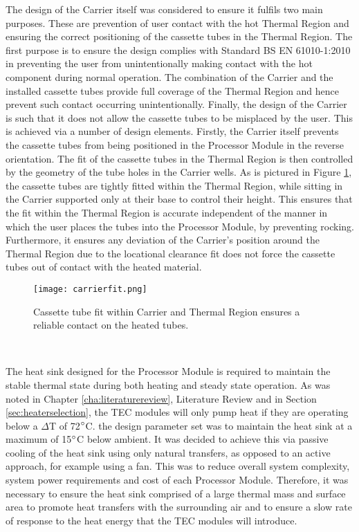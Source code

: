 The design of the Carrier itself was considered to ensure it fulfils two main purposes. These are prevention of user contact with the hot Thermal Region and ensuring the correct positioning of the cassette tubes in the Thermal Region. The first purpose is to ensure the design complies with Standard BS EN 61010-1:2010 \cite{BSI} in preventing the user from unintentionally making contact with the hot component during normal operation. The combination of the Carrier and the installed cassette tubes provide full coverage of the Thermal Region and hence prevent such contact occurring unintentionally. Finally, the design of the Carrier is such that it does not allow the cassette tubes to be misplaced by the user. This is achieved via a number of design elements. Firstly, the Carrier itself prevents the cassette tubes from being positioned in the Processor Module in the reverse orientation. The fit of the cassette tubes in the Thermal Region is then controlled by the geometry of the tube holes in the Carrier wells. As is pictured in Figure \ref{fig:carrierfit}, the cassette tubes are tightly fitted within the Thermal Region, while sitting in the Carrier supported only at their base to control their height. This ensures that the fit within the Thermal Region is accurate independent of the manner in which the user places the tubes into the Processor Module, by preventing rocking. Furthermore, it ensures any deviation of the Carrier's position around the Thermal Region due to the locational clearance fit does not force the cassette tubes out of contact with the heated material.

\begin{figure}[!htb]
	\centering
	\texttt{[image: carrierfit.png]}
	\caption[Cassette tube fit within Carrier and Thermal Region.]{Cassette tube fit within Carrier and Thermal Region ensures a reliable contact on the heated tubes.}
	\label{fig:carrierfit}
\end{figure} 
\FloatBarrier

The heat sink designed for the Processor Module is required to maintain the stable thermal state during both heating and steady state operation. As was noted in Chapter \ref{cha:literaturereview}, Literature Review and in Section \ref{sec:heaterselection}, the TEC modules will only pump heat if they are operating below a $\Delta$T of 72$\degree$C. the design parameter set was to maintain the heat sink at a maximum of 15$\degree$C below ambient. It was decided to achieve this via passive cooling of the heat sink using only natural transfers, as opposed to an active approach, for example using a fan. This was to reduce overall system complexity, system power requirements and cost of each Processor Module. Therefore, it was necessary to ensure the heat sink comprised of a large thermal mass and surface area to promote heat transfers with the surrounding air and to ensure a slow rate of response to the heat energy that the TEC modules will introduce.\\

